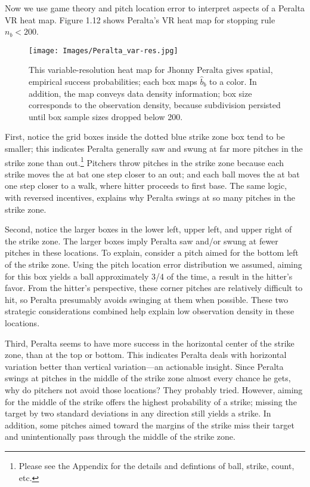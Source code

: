Now we use game theory and pitch location error to interpret aspects of a Peralta VR heat map. Figure 1.12 shows Peralta's VR heat map for stopping rule $n_{b} < 200$.
        \begin{figure}[H]
      	\centering      
      	\texttt{[image: Images/Peralta\_var-res.jpg]}
      	\caption{This variable-resolution heat map for Jhonny Peralta gives spatial, empirical success probabilities; each box maps $\hat{b}_{b}$ to a color. In addition, the map conveys data density information; box size corresponds to the observation density, because subdivision persisted until box sample sizes dropped below 200.}
        \end{figure}
First, notice the grid boxes inside the dotted blue strike zone box tend to be smaller; this indicates Peralta generally saw and swung at far more pitches in the strike zone than out.\footnote{Please see the Appendix for the details and defintions of ball, strike, count, etc.} Pitchers throw pitches in the strike zone because each strike moves the at bat one step closer to an out; and each ball moves the at bat one step closer to a walk, where hitter proceeds to first base. The same logic, with reversed incentives, explains why Peralta swings at so many pitches in the strike zone. 

Second, notice the larger boxes in the lower left, upper left, and upper right of the strike zone. The larger boxes imply Peralta saw and/or swung at fewer pitches in these locations. To explain, consider a pitch aimed for the bottom left of the strike zone. Using the pitch location error distribution we assumed, aiming for this box yields a ball approximately 3/4 of the time, a result in the hitter's favor. From the hitter's perspective, these corner pitches are relatively difficult to hit, so Peralta presumably avoids swinging at them when possible. These two strategic considerations combined help explain low observation density in these locations.

Third, Peralta seems to have more success in the horizontal center of the strike zone, than at the top or bottom. This indicates Peralta deals with horizontal variation better than vertical variation---an actionable insight. Since Peralta swings at pitches in the middle of the strike zone almost every chance he gets, why do pitchers not avoid those locations? They probably tried. However, aiming for the middle of the strike offers the highest probability of a strike; missing the target by two standard deviations in any direction still yields a strike. In addition, some pitches aimed toward the margins of the strike miss their target and unintentionally pass through the middle of the strike zone. 


